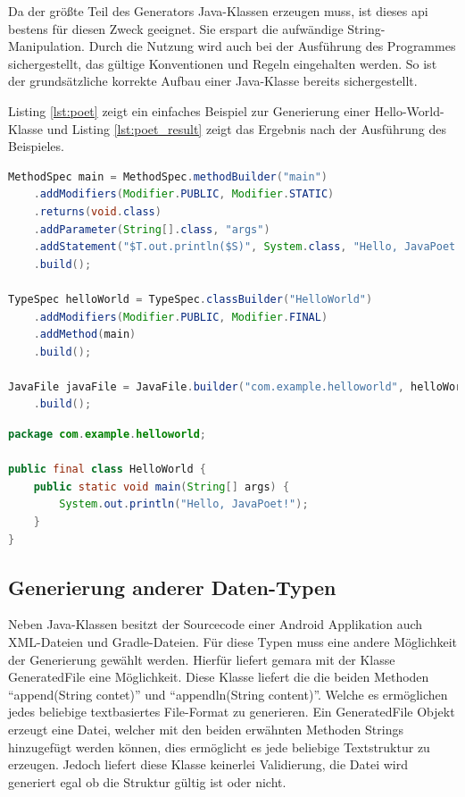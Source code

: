 Da der größte Teil des Generators Java-Klassen erzeugen muss, ist dieses \ac{api} bestens für diesen Zweck geeignet. Sie erspart die aufwändige String-Manipulation. Durch die Nutzung wird auch bei der Ausführung des Programmes sichergestellt, das gültige Konventionen und Regeln eingehalten werden. So ist der grundsätzliche korrekte Aufbau einer Java-Klasse bereits sichergestellt.

Listing \ref{lst:poet} zeigt ein einfaches Beispiel zur Generierung einer Hello-World-Klasse und Listing \ref{lst:poet_result} zeigt das Ergebnis nach der Ausführung des Beispieles.

\begin{lstlisting}[label=lst:poet,
language=java,
firstnumber=1,
caption=Beispiel für die Generation einer Hallo-World-Klasse \cite{poet}]				   
MethodSpec main = MethodSpec.methodBuilder("main")
	.addModifiers(Modifier.PUBLIC, Modifier.STATIC)
	.returns(void.class)
	.addParameter(String[].class, "args")
	.addStatement("$T.out.println($S)", System.class, "Hello, JavaPoet!")
	.build();

TypeSpec helloWorld = TypeSpec.classBuilder("HelloWorld")
	.addModifiers(Modifier.PUBLIC, Modifier.FINAL)
	.addMethod(main)
	.build();

JavaFile javaFile = JavaFile.builder("com.example.helloworld", helloWorld)
	.build();
\end{lstlisting}

\begin{lstlisting}[label=lst:poet_result,
language=java,
firstnumber=1,
caption=Ergebnis der Generation von Listing \ref{lst:poet} \cite{poet}]				   
package com.example.helloworld;

public final class HelloWorld {
	public static void main(String[] args) {
		System.out.println("Hello, JavaPoet!");
	}
}
\end{lstlisting}

\subsection{Generierung anderer Daten-Typen}

Neben Java-Klassen besitzt der Sourcecode einer Android Applikation auch XML-Dateien und Gradle-Dateien. Für diese Typen muss eine andere Möglichkeit der Generierung gewählt werden. Hierfür liefert \acf{gemara} mit der Klasse GeneratedFile eine Möglichkeit. Diese Klasse liefert die die beiden Methoden \enquote{append(String contet)} und \enquote{appendln(String content)}. Welche es ermöglichen jedes beliebige textbasiertes File-Format zu generieren. Ein GeneratedFile Objekt erzeugt eine Datei, welcher mit den beiden erwähnten Methoden Strings hinzugefügt werden können, dies ermöglicht es jede beliebige Textstruktur zu erzeugen. Jedoch liefert diese Klasse keinerlei Validierung, die Datei wird generiert egal ob die Struktur gültig ist oder nicht.

